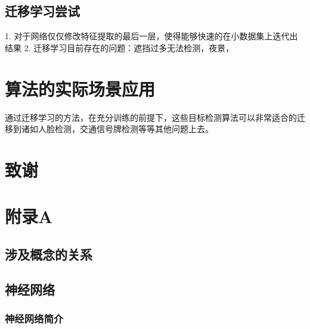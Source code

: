 \documentclass[12pt,a4paper,titlepage]{article}
\begin{document}
\subsection{迁移学习尝试}
1. 对于网络仅仅修改特征提取的最后一层，使得能够快速的在小数据集上迭代出结果
2. 迁移学习目前存在的问题：遮挡过多无法检测，夜景，


\section{算法的实际场景应用}
通过迁移学习的方法，在充分训练的前提下，这些目标检测算法可以非常适合的迁移到诸如人脸检测，交通信号牌检测等等其他问题上去。

\section*{致谢}


\newpage
\renewcommand\refname{\zihao{-2} 参考文献}


\newpage
\section*{附录A}

\subsection*{涉及概念的关系}


\subsection*{神经网络}
\subsubsection*{神经网络简介}
\end{document}
